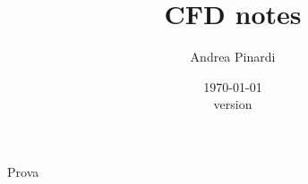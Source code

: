 \documentclass[a4paper]{article}
\begin{document}
\title{CFD notes}
\author{Andrea Pinardi}
\date{\today \\[1ex] version \version}
\maketitle

Prova \cite{Qin2021} 


\appendix
%



\end{document}
